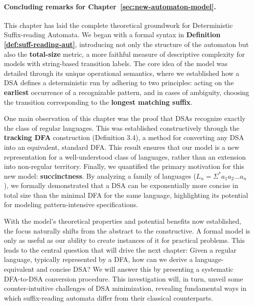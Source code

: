 \paragraph*{Concluding remarks for Chapter~\ref{sec:new-automaton-model}.}
This chapter has laid the complete theoretical groundwork for Deterministic Suffix-reading Automata. We began with a formal syntax in \textbf{Definition \ref{def:suff-reading-aut}}, introducing not only the structure of the automaton but also the \textbf{total-size} metric, a more faithful measure of descriptive complexity for models with string-based transition labels. The core idea of the model was detailed through its unique operational semantics, where we established how a DSA defines a deterministic run by adhering to two principles: acting on the \textbf{earliest} occurrence of a recognizable pattern, and in cases of ambiguity, choosing the transition corresponding to the \textbf{longest matching suffix}.

One main observation of this chapter was the proof that DSAs recognize exactly the class of regular languages. This was established constructively through the \textbf{tracking DFA} construction (Definition 3.4), a method for converting any DSA into an equivalent, standard DFA. This result %
ensures that our model is a new representation for a well-understood class of languages, rather than an extension into non-regular territory. Finally, we quantified the primary motivation for this new model: \textbf{succinctness}. By analyzing a family of languages ($L_n = \Sigma^* a_1 a_2 \dots a_n$), we formally demonstrated that a DSA can be exponentially more concise in total size than the minimal DFA for the same language, highlighting its potential for modeling pattern-intensive specifications.

With the model's theoretical properties and potential benefits now established, the focus naturally shifts from the abstract to the constructive. A formal model is only as useful as our ability to create instances of it for practical problems. This leads to the central question that will drive the next chapter: Given a regular language, typically represented by a DFA, how can we derive a language-equivalent and concise DSA? We will answer this by presenting a systematic DFA-to-DSA conversion procedure. This investigation will, in turn, unveil some counter-intuitive challenges of DSA minimization, revealing fundamental ways in which suffix-reading automata differ from their classical counterparts.